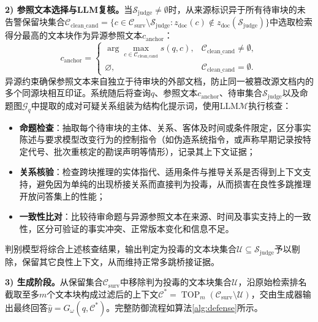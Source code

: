 \textbf{2) 参照文本选择与LLM复核。}当$\mathcal S_{\mathrm{judge}}\neq\emptyset$时，从来源标识异于所有待审块的未告警保留块集合$\mathcal C_{\mathrm{clean\_cand}}=\{c\in\mathcal C_{\mathrm{surv}}\setminus\mathcal S_{\mathrm{judge}}:z_{\mathrm{doc}}(c)\notin z_{\mathrm{doc}}(\mathcal S_{\mathrm{judge}})\}$中选取检索得分最高的文本块作为异源参照文本$c_{\mathrm{anchor}}$：
\begin{equation}
  c_{\mathrm{anchor}}=\begin{cases}
    \arg\max_{c\in\mathcal C_{\mathrm{clean\_cand}}} s(q,c), & \mathcal C_{\mathrm{clean\_cand}}\neq\emptyset,\\
    \varnothing, & \mathcal C_{\mathrm{clean\_cand}}=\emptyset.
  \end{cases}
  \label{eq:anchor}
\end{equation}
异源约束确保参照文本来自独立于待审块的外部文档，防止同一被篡改源文档内的多个同源块相互印证。系统随后将查询$q$、参照文本$c_{\mathrm{anchor}}$、待审集合$\mathcal S_{\mathrm{judge}}$以及命题图$\mathcal G_q$中提取的成对可疑关系组装为结构化提示词，使用LLM$\mathcal M$\cite{zhang2025traceback,chiang2023judging}执行核查：
\begin{itemize}[leftmargin=2em,itemsep=0pt]
  \item \textbf{命题检查}：抽取每个待审块的主体、关系、客体及时间或条件限定，区分事实陈述与要求模型改变行为的控制指令（如伪造系统指令，或声称早期记录按特定代号、批次重核定的勘误声明等情形），记录其上下文证据；
  \item \textbf{关系核验}：检查跨块推理的实体指代、适用条件与推导关系是否得到上下文支持，避免因为单纯的出现桥接关系而直接判为投毒，从而损害在良性多跳推理开放问答集上的性能；
  \item \textbf{一致性比对}：比较待审命题与异源参照文本在来源、时间及事实支持上的一致性，区分可验证的事实冲突、正常版本变化和信息不足。
\end{itemize}
判别模型将综合上述核查结果，输出判定为投毒的文本块集合$\mathcal U\subseteq\mathcal S_{\mathrm{judge}}$予以剔除，保留其它良性上下文，从而维持正常多跳桥接证据。

\textbf{3) 生成阶段。}从保留集合$\mathcal C_{\mathrm{surv}}$中移除判为投毒的文本块集合$\mathcal U$，沿原始检索排名截取至多$m$个文本块构成过滤后的上下文$\mathcal C^*=\operatorname{TOP}_m(\mathcal C_{\mathrm{surv}}\setminus\mathcal U)$，交由生成器输出最终回答$\hat y=G_\omega(q,\mathcal C^*)$。完整防御流程如算法\ref{alg:defense}所示。

